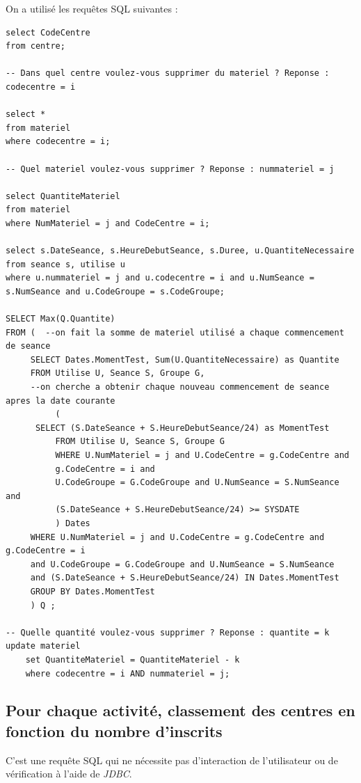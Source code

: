 \documentclass[10pt]{article}
\begin{document}
On a utilisé les requêtes SQL suivantes :

\begin{small}
\begin{verbatim}
select CodeCentre
from centre;

-- Dans quel centre voulez-vous supprimer du materiel ? Reponse : codecentre = i

select *
from materiel 
where codecentre = i;

-- Quel materiel voulez-vous supprimer ? Reponse : nummateriel = j

select QuantiteMateriel
from materiel
where NumMateriel = j and CodeCentre = i;

select s.DateSeance, s.HeureDebutSeance, s.Duree, u.QuantiteNecessaire
from seance s, utilise u
where u.nummateriel = j and u.codecentre = i and u.NumSeance = s.NumSeance and u.CodeGroupe = s.CodeGroupe;

SELECT Max(Q.Quantite)
FROM ( 	--on fait la somme de materiel utilisé a chaque commencement de seance
     SELECT Dates.MomentTest, Sum(U.QuantiteNecessaire) as Quantite
     FROM Utilise U, Seance S, Groupe G, 
     --on cherche a obtenir chaque nouveau commencement de seance apres la date courante
          (
	  SELECT (S.DateSeance + S.HeureDebutSeance/24) as MomentTest
     	  FROM Utilise U, Seance S, Groupe G
     	  WHERE U.NumMateriel = j and U.CodeCentre = g.CodeCentre and 
     	  g.CodeCentre = i and
     	  U.CodeGroupe = G.CodeGroupe and U.NumSeance = S.NumSeance and 
     	  (S.DateSeance + S.HeureDebutSeance/24) >= SYSDATE
     	  ) Dates
     WHERE U.NumMateriel = j and U.CodeCentre = g.CodeCentre and g.CodeCentre = i
     and U.CodeGroupe = G.CodeGroupe and U.NumSeance = S.NumSeance 
     and (S.DateSeance + S.HeureDebutSeance/24) IN Dates.MomentTest
     GROUP BY Dates.MomentTest
     ) Q ;

-- Quelle quantité voulez-vous supprimer ? Reponse : quantite = k
update materiel
	set QuantiteMateriel = QuantiteMateriel - k
	where codecentre = i AND nummateriel = j;
\end{verbatim}
\end{small}

\subsection{Pour chaque activité, classement des centres en fonction du nombre d'inscrits}

C'est une requête SQL qui ne nécessite pas d'interaction de l'utilisateur ou de vérification à l'aide de \emph{JDBC}. 
\end{document}

